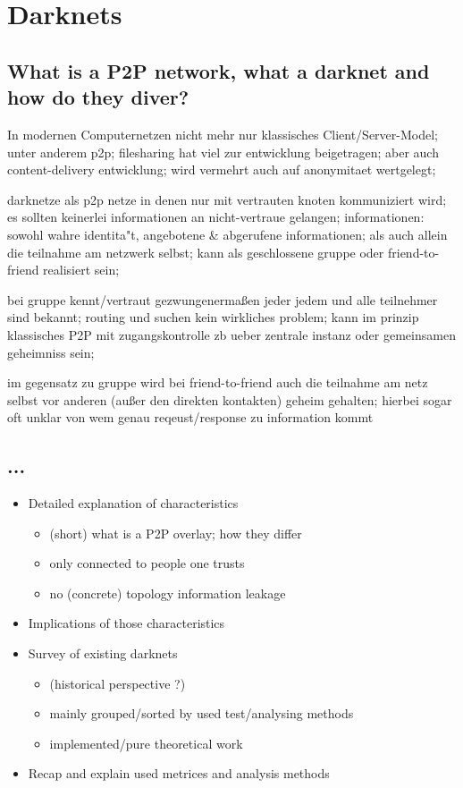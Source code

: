 \chapter{Darknets}

\section{What is a P2P network, what a darknet and how do they diver?}
In modernen Computernetzen nicht mehr nur klassisches Client/Server-Model; unter anderem p2p; filesharing hat viel zur entwicklung beigetragen; aber auch content-delivery entwicklung; wird vermehrt auch auf anonymitaet wertgelegt;

darknetze als p2p netze in denen nur mit vertrauten knoten kommuniziert wird; es sollten keinerlei informationen an nicht-vertraue gelangen; informationen: sowohl wahre identita"t, angebotene & abgerufene informationen; als auch allein die teilnahme am netzwerk selbst; kann als geschlossene gruppe oder friend-to-friend realisiert sein;

bei gruppe kennt/vertraut gezwungenermaßen jeder jedem und alle teilnehmer sind bekannt; routing und suchen kein wirkliches problem; kann im prinzip klassisches P2P mit zugangskontrolle zb ueber zentrale instanz oder gemeinsamen geheimniss sein;

im gegensatz zu gruppe wird bei friend-to-friend auch die teilnahme am netz selbst vor anderen (außer den direkten kontakten) geheim gehalten; hierbei sogar oft unklar von wem genau reqeust/response zu information kommt 


\section{...}
\begin{itemize}
\item    Detailed explanation of characteristics
\begin{itemize}
\item        (short) what is a P2P overlay; how they differ
\item        only connected to people one trusts
\item        no (concrete) topology information leakage
\end{itemize}
\item    Implications of those characteristics
\item    Survey of existing darknets
\begin{itemize}
\item        (historical perspective ?)
\item        mainly grouped/sorted by used test/analysing methods
\item        implemented/pure theoretical work
\end{itemize}
\item    Recap and explain used metrices and analysis methods
\end{itemize}

